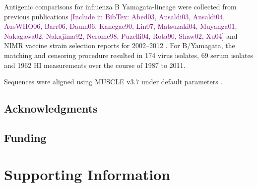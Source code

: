 \documentclass[11pt,oneside,letterpaper]{article}
\def\tbc#1{\textcolor{purple}{[#1]}}
\begin{document}
Antigenic comparisons for influenza B Yamagata-lineage were collected from previous publications \cite{Hay01} \tbc{Include in BibTex: Abed03, Ansaldi03, Ansaldi04, AusWHO06, Barr06, Daum06, Kanegae90, Lin07, Matsuzaki04, Muyanga01, Nakagawa02, Nakajima92, Nerome98, Puzelli04, Rota90, Shaw02, Xu04} and NIMR vaccine strain selection reports for 2002--2012 \cite{NIMR02,NIMR03,NIMR04,NIMRFeb05,NIMRSep05,NIMRMarch06,NIMRSep06,NIMRMarch07,NIMRSep07,NIMRMarch08,NIMRFeb09,NIMRSep09,NIMRFeb10,NIMRSep10,NIMRFeb11,NIMRSep11,NIMRFeb12}.
For B/Yamagata, the matching and censoring procedure resulted in 174 virus isolates, 69 serum isolates and 1962 HI measurements over the course of 1987 to 2011.

Sequences were aligned using MUSCLE v3.7 under default parameters \cite{MUSCLE}.

\subsection*{Acknowledgments} 

\subsection*{Funding} 




\pagebreak

\setcounter{figure}{0}
\setcounter{table}{0}
\setcounter{page}{1}
\renewcommand{\thefigure}{S\arabic{figure}}
\renewcommand{\thetable}{S\arabic{table}}
\renewcommand{\thepage}{S\arabic{page}}

\section*{Supporting Information}

\pagebreak
\end{document}
